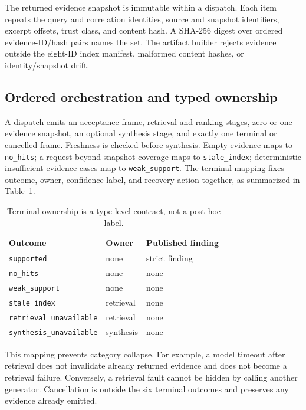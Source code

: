 \documentclass[10pt,twocolumn]{article}
\newcommand{\code}[1]{\texttt{#1}}
\begin{document}
The returned evidence snapshot is immutable within a dispatch.  Each item repeats the query and correlation identities, source and snapshot identifiers, excerpt offsets, trust class, and content hash.  A SHA-256 digest over ordered evidence-ID/hash pairs names the set.  The artifact builder rejects evidence outside the eight-ID index manifest, malformed content hashes, or identity/snapshot drift.

\subsection{Ordered orchestration and typed ownership}
A dispatch emits an acceptance frame, retrieval and ranking stages, zero or one evidence snapshot, an optional synthesis stage, and exactly one terminal or cancelled frame.  Freshness is checked before synthesis.  Empty evidence maps to \code{no\_hits}; a request beyond snapshot coverage maps to \code{stale\_index}; deterministic insufficient-evidence cases map to \code{weak\_support}.  The terminal mapping fixes outcome, owner, confidence label, and recovery action together, as summarized in Table~\ref{tab:ownership}.

\begin{table}[t]
\centering
\caption{Terminal ownership is a type-level contract, not a post-hoc label.}
\label{tab:ownership}
\small
\begin{tabular}{@{}lll@{}}
\toprule
Outcome & Owner & Published finding \\
\midrule
\code{supported} & none & strict finding \\
\code{no\_hits} & none & none \\
\code{weak\_support} & none & none \\
\code{stale\_index} & retrieval & none \\
\code{retrieval\_unavailable} & retrieval & none \\
\code{synthesis\_unavailable} & synthesis & none \\
\bottomrule
\end{tabular}
\end{table}

This mapping prevents category collapse.  For example, a model timeout after retrieval does not invalidate already returned evidence and does not become a retrieval failure.  Conversely, a retrieval fault cannot be hidden by calling another generator.  Cancellation is outside the six terminal outcomes and preserves any evidence already emitted.
\end{document}
